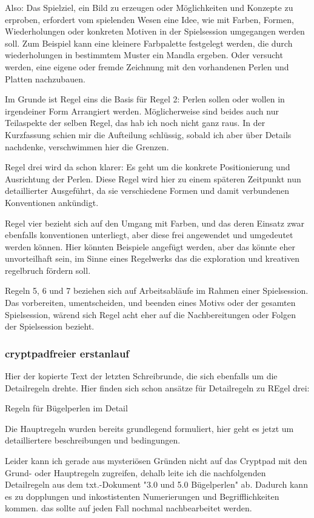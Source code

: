 \documentclass[11pt,a4paper,twoside]{scrreprt}
\begin{document}
Also: Das Spielziel, ein Bild zu erzeugen oder Möglichkeiten und Konzepte zu erproben, erfordert vom spielenden Wesen eine Idee, wie mit Farben, Formen, Wiederholungen oder konkreten Motiven in der Spielsession umgegangen werden soll. 
Zum Beispiel kann eine kleinere Farbpalette festgelegt werden, die durch wiederholungen in bestimmtem Muster ein Mandla ergeben. Oder versucht werden, eine eigene oder fremde Zeichnung mit den vorhandenen Perlen und Platten nachzubauen.

Im Grunde ist Regel eins die Basis für Regel 2:  Perlen sollen oder wollen in irgendeiner Form Arrangiert werden. Möglicherweise sind beides auch nur Teilaspekte der selben Regel, das hab ich noch nicht ganz raus. In der Kurzfassung schien mir die Aufteilung schlüssig, sobald ich aber über Details nachdenke, verschwimmen hier die Grenzen.

Regel drei wird da schon klarer: Es geht um die konkrete Positionierung und Ausrichtung der Perlen. Diese Regel wird hier zu einem späteren Zeitpunkt nun detaillierter Ausgeführt, da sie verschiedene Formen und damit verbundenen Konventionen ankündigt.

Regel vier bezieht sich auf den Umgang mit Farben, und das deren Einsatz zwar ebenfalls konventionen unterliegt, aber diese frei angewendet und umgedeutet werden können. Hier könnten Beispiele angefügt werden, aber das könnte eher unvorteilhaft sein, im Sinne eines Regelwerks das die exploration und kreativen regelbruch fördern soll.

Regeln 5, 6 und 7 beziehen sich auf Arbeitsabläufe im Rahmen einer Spielsession. Das vorbereiten, umentscheiden, und beenden eines Motivs oder der gesamten Spielsession, wärend sich Regel acht eher auf die Nachbereitungen oder Folgen der Spielsession bezieht.

			\subsubsection{cryptpadfreier erstanlauf}

Hier der kopierte Text der letzten Schreibrunde, die sich ebenfalls um die Detailregeln drehte. Hier finden sich schon ansätze für Detailregeln zu REgel drei:

Regeln für Bügelperlen im Detail

Die Hauptregeln wurden bereits grundlegend formuliert, hier geht es jetzt um detailliertere beschreibungen und bedingungen. 

Leider kann ich gerade aus mysteriösen Gründen nicht auf das Cryptpad mit den Grund- oder Hauptregeln zugreifen, dehalb leite ich die nachfolgenden Detailregeln aus dem txt.-Dokument "3.0 und 5.0 Bügelperlen" ab. Dadurch kann es zu dopplungen und inkostistenten Numerierungen und Begrifflichkeiten kommen. das sollte auf jeden Fall nochmal nachbearbeitet werden.
\end{document}
